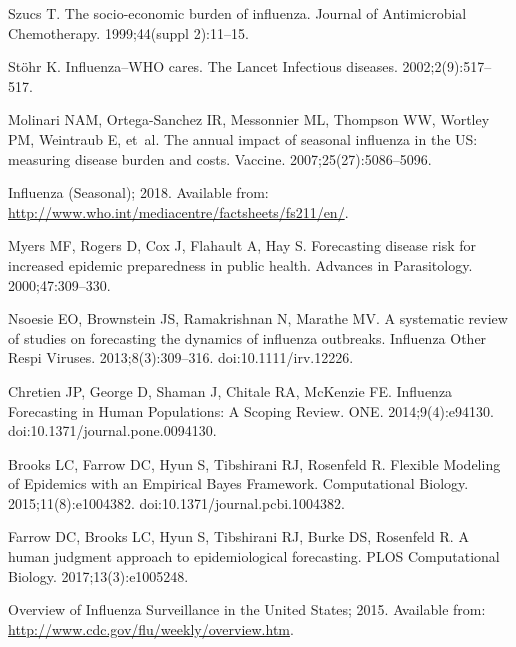 \documentclass[10pt,letterpaper]{article}
\begin{document}
%

\begin{thebibliography}{10}

Szucs T.
\newblock The socio-economic burden of influenza.
\newblock Journal of Antimicrobial Chemotherapy. 1999;44(suppl 2):11--15.

St{\"o}hr K.
\newblock Influenza--WHO cares.
\newblock The Lancet Infectious diseases. 2002;2(9):517--517.

Molinari NAM, Ortega-Sanchez IR, Messonnier ML, Thompson WW, Wortley PM,
  Weintraub E, et~al.
\newblock The annual impact of seasonal influenza in the US: measuring disease
  burden and costs.
\newblock Vaccine. 2007;25(27):5086--5096.

Influenza (Seasonal); 2018.
\newblock Available from:
  \url{http://www.who.int/mediacentre/factsheets/fs211/en/}.

Myers MF, Rogers D, Cox J, Flahault A, Hay S.
\newblock Forecasting disease risk for increased epidemic preparedness in
  public health.
\newblock Advances in Parasitology. 2000;47:309--330.

Nsoesie EO, Brownstein JS, Ramakrishnan N, Marathe MV.
\newblock A systematic review of studies on forecasting the dynamics of
  influenza outbreaks.
\newblock Influenza Other Respi Viruses. 2013;8(3):309--316.
\newblock doi:{10.1111/irv.12226}.

Chretien JP, George D, Shaman J, Chitale RA, McKenzie FE.
\newblock Influenza Forecasting in Human Populations: A Scoping Review.
 {ONE}. 2014;9(4):e94130.
\newblock doi:{10.1371/journal.pone.0094130}.

Brooks LC, Farrow DC, Hyun S, Tibshirani RJ, Rosenfeld R.
\newblock Flexible Modeling of Epidemics with an Empirical Bayes Framework.
 Computational Biology. 2015;11(8):e1004382.
\newblock doi:{10.1371/journal.pcbi.1004382}.

Farrow DC, Brooks LC, Hyun S, Tibshirani RJ, Burke DS, Rosenfeld R.
\newblock A human judgment approach to epidemiological forecasting.
\newblock PLOS Computational Biology. 2017;13(3):e1005248.

Overview of Influenza Surveillance in the United States; 2015.
\newblock Available from: \url{http://www.cdc.gov/flu/weekly/overview.htm}.


\end{thebibliography}
\end{document}
